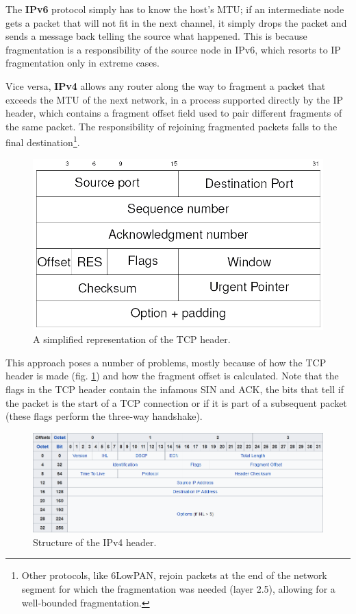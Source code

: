 The \textbf{IPv6} protocol simply has to know the host’s MTU; if an intermediate node gets a packet that will not fit in the next channel, it simply drops the packet and sends a message back telling the source what happened. This is because fragmentation is a responsibility of the source node in IPv6, which resorts to IP fragmentation only in extreme cases.

Vice versa, \textbf{IPv4} allows any router along the way to fragment a packet that exceeds the MTU of the next network, in a process supported directly by the IP header, which contains a fragment offset field used to pair different fragments of the same packet. The responsibility of rejoining fragmented packets falls to the final destination\footnote{Other protocols, like 6LowPAN, rejoin packets at the end of the network segment for which the fragmentation was needed (layer 2.5), allowing for a well-bounded fragmentation.}.

\begin{figure}[H]
    \centering
    \includegraphics[scale=0.5]{img/tcp_header.png}
    \decoRule
    \caption{A simplified representation of the TCP header.}
    \label{fig:tcp_header}
\end{figure}
 
This approach poses a number of problems, mostly because of how the TCP header is made (fig. \ref{fig:tcp_header}) and how the fragment offset is calculated. Note that the flags in the TCP header contain the infamous SIN and ACK, the bits that tell if the packet is the start of a TCP connection or if it is part of a subsequent packet (these flags perform the three-way handshake).

\begin{figure}[h]
    \centering
    \includegraphics[scale=0.5]{img/ipv4_header.png}
    \decoRule
    \caption{Structure of the IPv4 header.}
    \label{fig:ipv4_header}
\end{figure}

